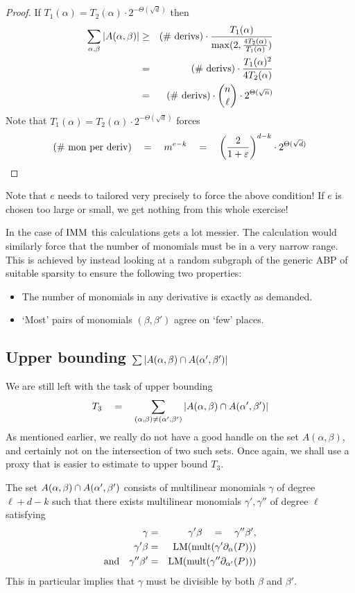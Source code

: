 \begin{proof}
If $T_1(\alpha) = T_2(\alpha) \cdot 2^{-\Theta(\sqrt{d})}$ then
\begin{eqnarray*}
\sum_{\alpha,\beta}\left|A(\alpha, \beta)\right| &\geq& \text{(\# derivs)}\cdot \frac{T_1(\alpha)}{\max(2, \frac{4T_2(\alpha)}{T_1(\alpha)})}\\
 & = & \text{(\# derivs)} \cdot \frac{T_1(\alpha)^2}{4 T_2(\alpha)}\\
 & = & \text{(\# derivs)} \cdot \binom{n}{\ell} \cdot 2^{\Theta(\sqrt{n})}
\end{eqnarray*}
Note that $T_1(\alpha) = T_2(\alpha) \cdot 2^{-\Theta(\sqrt{d})}$ forces 
\[
\text{(\# mon per deriv)} \quad = \quad  m^{e-k} \quad = \quad  \left(\frac{2}{1+\varepsilon}\right)^{d-k} \cdot 2^{\Theta(\sqrt{d})}
\]
\end{proof}

Note that $e$ needs to tailored very precisely to force the above condition! If $e$ is chosen too large or small, we get nothing from this whole exercise!

In the case of $\mathrm{IMM}$ this calculations gets a lot messier. The calculation would similarly force that the number of monomials must be in a very narrow range. This is achieved by instead looking at a random subgraph of the generic ABP of suitable sparsity to ensure the following two properties:
\begin{itemize}
  \item The number of monomials in any derivative is exactly as demanded. 
  \item `Most' pairs of monomials $(\beta, \beta')$ agree on `few' places. 
\end{itemize}

\subsection*{Upper bounding $\sum \left|A(\alpha,\beta)\cap A(\alpha',\beta')\right|$}

We are still left with the task of upper bounding
\[
T_3 \quad = \quad \sum_{(\alpha, \beta)\neq (\alpha',\beta')} \left|A(\alpha, \beta) \cap A(\alpha',\beta')\right|
\]
As mentioned earlier, we really do not have a good handle on the set $A(\alpha, \beta)$, and certainly not on the intersection of two such sets. Once again, we shall use a proxy that is easier to estimate to upper bound $T_3$. 

The set $A(\alpha, \beta) \cap A(\alpha',\beta')$ consists of multilinear monomials $\gamma$ of degree $\ell + d -k$ such that there exists multilinear monomials $\gamma', \gamma''$ of degree $\ell$ satisfying
\begin{eqnarray*}
\gamma & = & \gamma' \beta \quad = \quad \gamma'' \beta',\\
 \gamma'\beta & = & \mathrm{LM}(\mathrm{mult}(\gamma' \partial_\alpha(P)))\\
\text{and}\quad \gamma''\beta' & = & \mathrm{LM}(\mathrm{mult}(\gamma'' \partial_{\alpha'}(P)))
\end{eqnarray*}
This in particular implies that $\gamma$ must be divisible by both $\beta$ and $\beta'$. 

